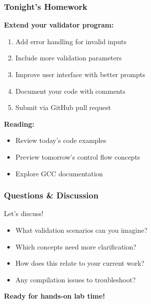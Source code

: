 \documentclass{beamer}
\begin{document}
\begin{frame}
\frametitle{Tonight's Homework}
\textbf{Extend your validator program:}
\begin{enumerate}
    \item Add error handling for invalid inputs
    \item Include more validation parameters
    \item Improve user interface with better prompts
    \item Document your code with comments
    \item Submit via GitHub pull request
\end{enumerate}

\vspace{0.5cm}
\textbf{Reading:}
\begin{itemize}
    \item Review today's code examples
    \item Preview tomorrow's control flow concepts
    \item Explore GCC documentation
\end{itemize}
\end{frame}

\begin{frame}
\frametitle{Questions \& Discussion}
\begin{center}
\Large Let's discuss!
\end{center}

\begin{itemize}
    \item What validation scenarios can you imagine?
    \item Which concepts need more clarification?
    \item How does this relate to your current work?
    \item Any compilation issues to troubleshoot?
\end{itemize}

\vspace{1cm}
\begin{center}
\textbf{Ready for hands-on lab time!}
\end{center}
\end{frame}
\end{document}
